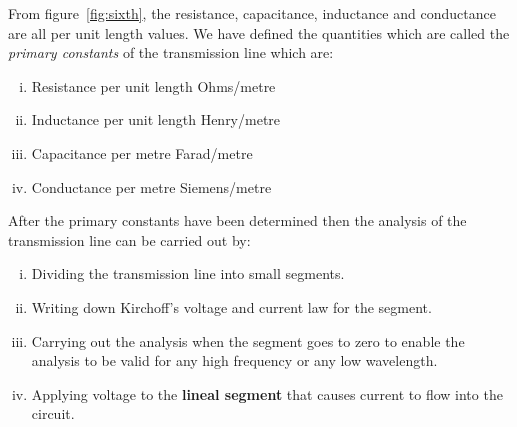 From figure~\ref{fig:sixth}, the resistance, capacitance, inductance and conductance are all per unit length values. We have defined the quantities which are called the \textit{primary constants} of the transmission line which are:
\begin{enumerate}[(i)]
\item Resistance per unit length \textemdash\; Ohms/metre
\item Inductance per unit length \textemdash\; Henry/metre
\item Capacitance per metre \textemdash\; Farad/metre
\item Conductance per metre \textemdash\; Siemens/metre
\end{enumerate}
After the primary constants have been determined then the analysis of the transmission line can be carried out by:
\begin{enumerate}[(i)]

\item Dividing the transmission line into small segments.
\item Writing down Kirchoff's voltage and current law for the segment.
\item Carrying out the analysis when the segment goes to zero to enable the analysis to be valid for any high frequency or any low wavelength. 
\item Applying voltage to the \textbf{lineal segment}  that causes current to flow into the circuit.
\end{enumerate}

